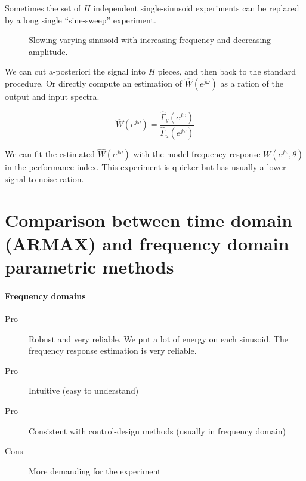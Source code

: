\begin{rem}
    Sometimes the set of $H$ independent single-sinusoid experiments can be replaced by a long single ``sine-sweep'' experiment.

    \begin{figure}[H]
        \centering
        \caption*{Slowing-varying sinusoid with increasing frequency and decreasing amplitude.}
    \end{figure}

    We can cut a-posteriori the signal into $H$ pieces, and then back to the standard procedure.
    Or directly compute an estimation of $\hat{W}(e^{j\omega})$ as a ration of the output and input spectra.

    \[
        \hat{W}(e^{j\omega}) = \frac{\hat{\Gamma}_y(e^{j\omega})}{\hat{\Gamma}_u(e^{j\omega})}
    \]

    We can fit the estimated $\hat{W}(e^{j\omega})$ with the model frequency response $W(e^{j\omega}, \theta)$ in the performance index.
    This experiment is quicker but has usually a lower signal-to-noise-ration.
\end{rem}

\section{Comparison between time domain (ARMAX) and frequency domain parametric methods}

\paragraph{Frequency domains}
\begin{description}
    \item[Pro] Robust and very reliable. We put a lot of energy on each sinusoid. The frequency response estimation is very reliable.
    \item[Pro] Intuitive (easy to understand)
    \item[Pro] Consistent with control-design methods (usually in frequency domain)
    \item[Cons] More demanding for the experiment
\end{description}

